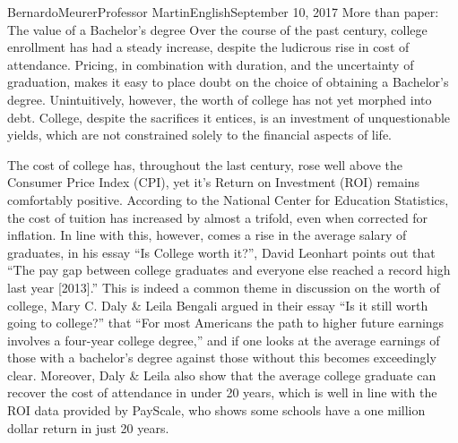 \documentclass[12pt,letterpaper]{article}
\begin{document}
    \begin{mla}{Bernardo}{Meurer}{Professor Martin}{English}{September 10, 2017}%
        {More than paper: The value of a Bachelor's degree}
    Over the course of the past century, college enrollment has had a steady 
    increase, despite the ludicrous rise in cost of attendance. Pricing, in 
    combination with duration, and the uncertainty of graduation, makes it easy 
    to place doubt on the choice of obtaining a Bachelor's degree. 
    Unintuitively, however, the worth of college has not yet morphed into debt. 
    College, despite the sacrifices it entices, is an investment of 
    unquestionable yields, which are not constrained solely to the financial 
    aspects of life.

    The cost of college has, throughout the last century, rose well above the 
    Consumer Price Index (CPI), yet it's Return on Investment (ROI) remains 
    comfortably positive. According to the National Center for Education 
    Statistics, the cost of tuition has increased by almost a trifold, even 
    when corrected for inflation. In line with this, however, comes a rise in 
    the average salary of graduates, in his essay ``Is College worth it?'', 
    David Leonhart points out that ``The pay gap between college graduates and 
    everyone else reached a record high last year [2013].'' This is indeed a 
    common theme in discussion on the worth of college, Mary C. Daly \& Leila 
    Bengali argued in their essay ``Is it still worth going to college?'' that
    ``For most Americans the path to higher future earnings involves a 
    four-year college degree,'' and if one looks at the average earnings of 
    those with a bachelor's degree against those without this becomes 
    exceedingly clear. Moreover, Daly \& Leila also show that the average college
    graduate can recover the cost of attendance in under 20 years, which is well 
    in line with the ROI data provided by PayScale, who shows some schools have a
    one million dollar return in just 20 years.


\end{mla}
\end{document}
